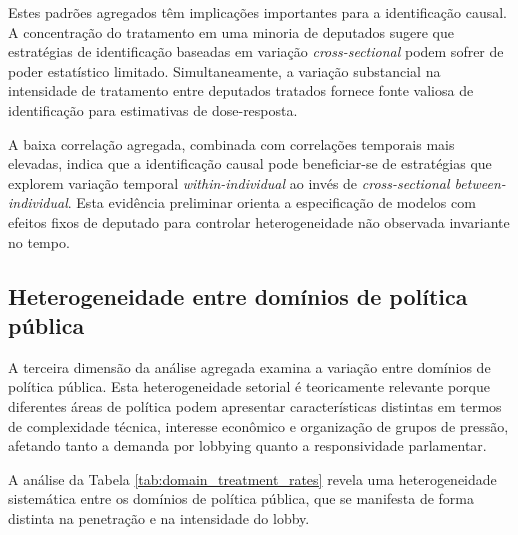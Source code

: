 Estes padrões agregados têm implicações importantes para a identificação causal. A concentração do tratamento em uma minoria de deputados sugere que estratégias de identificação baseadas em variação \textit{cross-sectional} podem sofrer de poder estatístico limitado. Simultaneamente, a variação substancial na intensidade de tratamento entre deputados tratados fornece fonte valiosa de identificação para estimativas de dose-resposta.

A baixa correlação agregada, combinada com correlações temporais mais elevadas, indica que a identificação causal pode beneficiar-se de estratégias que explorem variação temporal \textit{within-individual} ao invés de \textit{cross-sectional between-individual}. Esta evidência preliminar orienta a especificação de modelos com efeitos fixos de deputado para controlar heterogeneidade não observada invariante no tempo.


\subsection{Heterogeneidade entre domínios de política pública}

A terceira dimensão da análise agregada examina a variação entre domínios de política pública. Esta heterogeneidade setorial é teoricamente relevante porque diferentes áreas de política podem apresentar características distintas em termos de complexidade técnica, interesse econômico e organização de grupos de pressão, afetando tanto a demanda por lobbying quanto a responsividade parlamentar.


A análise da Tabela \ref{tab:domain_treatment_rates} revela uma heterogeneidade sistemática entre os domínios de política pública, que se manifesta de forma distinta na penetração e na intensidade do lobby.

